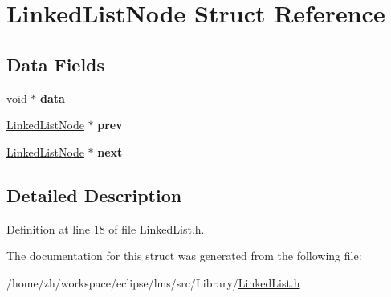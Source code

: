 \hypertarget{structLinkedListNode}{\section{Linked\-List\-Node Struct Reference}
\label{structLinkedListNode}
}
\subsection*{Data Fields}
\begin{DoxyCompactItemize}
\item 
\hypertarget{structLinkedListNode_a8762bd3731df051547b5fb5d307b1c7d}{void $\ast$ {\bfseries data}}\label{structLinkedListNode_a8762bd3731df051547b5fb5d307b1c7d}

\item 
\hypertarget{structLinkedListNode_ad949e133ff49f907dc9c6e62a546aa8f}{\hyperlink{structLinkedListNode}{Linked\-List\-Node} $\ast$ {\bfseries prev}}\label{structLinkedListNode_ad949e133ff49f907dc9c6e62a546aa8f}

\item 
\hypertarget{structLinkedListNode_a374de7efcac1a41f282640faeea01553}{\hyperlink{structLinkedListNode}{Linked\-List\-Node} $\ast$ {\bfseries next}}\label{structLinkedListNode_a374de7efcac1a41f282640faeea01553}

\end{DoxyCompactItemize}


\subsection{Detailed Description}


Definition at line 18 of file Linked\-List.\-h.



The documentation for this struct was generated from the following file\-:\begin{DoxyCompactItemize}
\item 
/home/zh/workspace/eclipse/lms/src/\-Library/\hyperlink{LinkedList_8h}{Linked\-List.\-h}\end{DoxyCompactItemize}
